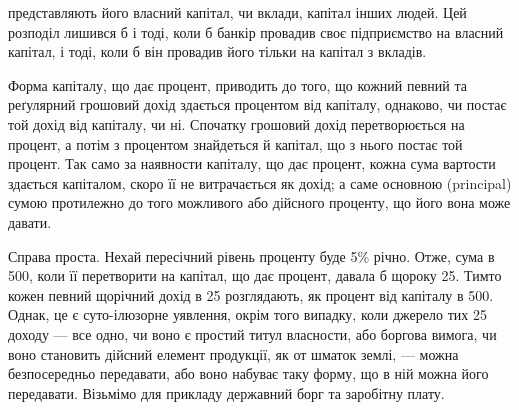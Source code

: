 \parcont{}  %
представляють його власний капітал, чи вклади, капітал інших людей. Цей
розподіл лишився б і тоді, коли б банкір провадив своє підприємство на власний
капітал, і тоді, коли б він провадив його тільки на капітал з вкладів.

Форма капіталу, що дає процент, приводить до того, що кожний певний
та реґулярний грошовий дохід здається процентом від капіталу, однаково, чи
постає той дохід від капіталу, чи ні. Спочатку грошовий дохід перетворюється
на процент, а потім з процентом знайдеться й капітал, що з нього постає той
процент. Так само за наявности капіталу, що дає процент, кожна сума вартости
здається капіталом, скоро її не витрачається як дохід; а саме основною (principal)
сумою протилежно до того можливого або дійсного проценту, що його вона
може давати.

Справа проста. Нехай пересічний рівень проценту буде 5\% річно. Отже,
сума в 500, коли її перетворити на капітал, що дає процент, давала б
щороку 25. Тимто кожен певний щорічний дохід в 25 розглядають,
як процент від капіталу в 500. Однак, це є суто-ілюзорне
уявлення, окрім того випадку, коли джерело тих 25 доходу — все одно,
чи воно є простий титул власности, або боргова вимога, чи воно становить
дійсний елемент продукції, як от шматок землі, — можна безпосередньо передавати,
або воно набуває таку форму, що в ній можна його передавати. Візьмімо
для прикладу державний борг та заробітну плату.

